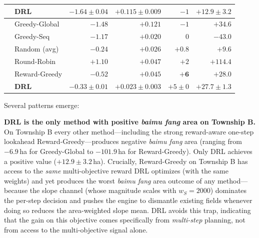 \documentclass[preprint,12pt]{elsarticle}
\begin{document}
\begin{table}[htbp]
{\begin{tabular}{llrrrr}
 & \textbf{DRL}     & $-1.64 \pm 0.04$ & $+0.115 \pm 0.009$& $-1$           & $\mathbf{+12.9 \pm 3.2}$ \\
\midrule
{}
 & Greedy-Global    & $\mathbf{-1.48}$ & $\mathbf{+0.121}$ & $-1$           & $+34.6$ \\
 & Greedy-Seq       & $-1.17$          & $+0.020$          & $0$            & $-43.0$ \\
 & Random (avg)     & $-0.24$          & $+0.026$          & $+0.8$         & $+9.6$ \\
 & Round-Robin      & $+1.10$          & $+0.047$          & $+2$           & $\mathbf{+114.4}$ \\
 & Reward-Greedy    & $-0.52$          & $+0.045$          & $\mathbf{+6}$  & $+28.0$ \\
 & \textbf{DRL}     & $-0.33 \pm 0.01$ & $+0.023 \pm 0.003$& $+5 \pm 0$     & $+27.7 \pm 1.3$ \\
\bottomrule
\end{tabular}%
}
\end{table}

Several patterns emerge:

\textbf{DRL is the only method with positive \textit{baimu fang} area on Township B.} On Township B every other method---including the strong reward-aware one-step lookahead Reward-Greedy---produces negative \textit{baimu fang} area (ranging from $-6.9$\,ha for Greedy-Global to $-101.9$\,ha for Reward-Greedy). Only DRL achieves a positive value ($+12.9\pm3.2$\,ha). Crucially, Reward-Greedy on Township B has access to the \emph{same} multi-objective reward DRL optimizes (with the same weights) and yet produces the worst \textit{baimu fang} area outcome of any method---because the slope channel (whose magnitude scales with $w_S=2000$) dominates the per-step decision and pushes the engine to dismantle existing fields whenever doing so reduces the area-weighted slope mean. DRL avoids this trap, indicating that the gain on this objective comes specifically from \emph{multi-step} planning, not from access to the multi-objective signal alone.
\end{document}
